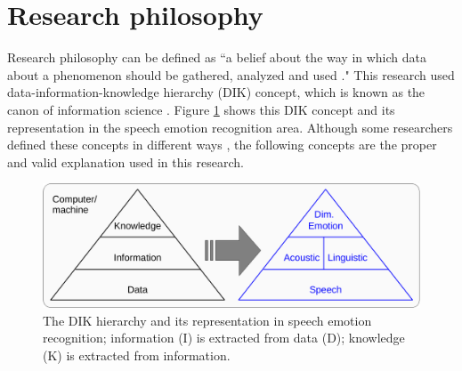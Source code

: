 \section{Research philosophy}
Research philosophy can be defined as ``a belief about the way in which data
about a phenomenon should be gathered, analyzed and used \cite{Davison1998}."
This research used data-information-knowledge hierarchy (DIK) concept, which is
known as the canon of information science \cite{Fricke2009}. Figure
\ref{fig:research_concept} shows this DIK concept and its representation in the
speech emotion recognition area. Although some researchers defined these
concepts in different ways \cite{Badia2013, Liu2013}, the following concepts
are the proper and valid explanation used in this research.



\begin{figure}[htbp]
    \centering
    \includegraphics[width=.8\textwidth]{../fig/DIK_SER-crop.pdf}
\caption{The DIK hierarchy and its representation in speech emotion
recognition; information (I) is extracted from data (D); knowledge (K) is
extracted from information.}
    \label{fig:research_concept}
\end{figure}

